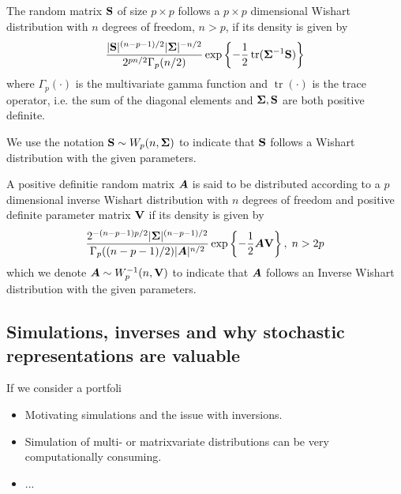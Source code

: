 \documentclass[]{book}\usepackage{knitr}
\begin{document}
\begin{definition}[]
	The random matrix $\mathbf{S}$ of size $p \times p$ follows a $p\times p$ dimensional Wishart distribution with $n$ degrees of freedom, $n > p$, if its density is given by
	\begin{equation}\label{eqn:wishart_density}
	\frac{|\mathbf{S}|^{(n-p-1)/2} |\mathbf{\Sigma}|^{- n/2} }{2^{pn/2} \Gamma_p (n/2) } \exp\left\{-\frac{1}{2} \operatorname{tr}(\mathbf{\Sigma}^{-1}\mathbf{S})  \right\}
	\end{equation}
	where $ \Gamma_p (\cdot) $ is the multivariate gamma function and $\operatorname{tr}(\cdot)$ is the trace operator, i.e. the sum of the diagonal elements and $\mathbf{\Sigma}, \mathbf{S}$ are both positive definite.
\end{definition}
We use the notation $\mathbf{S} \sim W_p(n, \mathbf{\Sigma})$ to indicate that $\mathbf{S}$ follows a Wishart distribution with the given parameters.

\begin{definition}
	A positive definitie random matrix $\mbox{\boldmath$A$}$ is said to be distributed according to a $p$ dimensional inverse Wishart distribution with $n$ degrees of freedom and positive definite parameter matrix $\mathbf{V}$ if its density is given by
	\begin{equation}\label{eqn:inverse_wishart}
	\frac{2^{-(n-p-1)p/2} |\mathbf{\Sigma}|^{(n-p-1)/2} }{\Gamma_p ((n-p-1)/2) |\mbox{\boldmath$A$}|^{n/2}} \exp\left\{ -\frac{1}{2} \mbox{\boldmath$A$} \mathbf{V} \right\}, \; n> 2p
	\end{equation}
	which we denote $\mbox{\boldmath$A$} \sim W^{-1}_p(n, \mathbf{V})$ to indicate that $\mbox{\boldmath$A$}$ follows an Inverse Wishart distribution with the given parameters.
\end{definition}

\begin{definition}[]
\end{definition} 


\subsection{Simulations, inverses and why stochastic representations are valuable}
If we consider a portfoli  

\begin{itemize}
	\item Motivating simulations and the issue with inversions.
	\item Simulation of multi- or matrixvariate distributions can be very computationally consuming.
	\item ...
\end{itemize}
\end{document}
